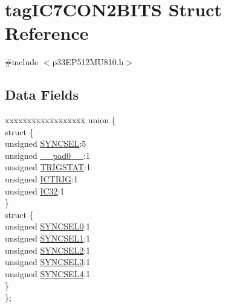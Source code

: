\hypertarget{structtag_i_c7_c_o_n2_b_i_t_s}{}\section{tag\+I\+C7\+C\+O\+N2\+B\+I\+TS Struct Reference}
\label{structtag_i_c7_c_o_n2_b_i_t_s}


{\ttfamily \#include $<$p33\+E\+P512\+M\+U810.\+h$>$}

\subsection*{Data Fields}
\begin{DoxyCompactItemize}
\item 
\begin{tabbing}
xx\=xx\=xx\=xx\=xx\=xx\=xx\=xx\=xx\=\kill
union \{\\
\>struct \{\\
\>\>unsigned \hyperlink{structtag_i_c7_c_o_n2_b_i_t_s_a35fbbe11485c2615ed27535b62c3fa35}{SYNCSEL}:5\\
\>\>unsigned \hyperlink{structtag_i_c7_c_o_n2_b_i_t_s_adf71f3d8410c1f1dbbc96680a92c49af}{\_\_pad0\_\_}:1\\
\>\>unsigned \hyperlink{structtag_i_c7_c_o_n2_b_i_t_s_ab379549de54ac93ad4aa73686c34cb7c}{TRIGSTAT}:1\\
\>\>unsigned \hyperlink{structtag_i_c7_c_o_n2_b_i_t_s_a79bd14cfd2e403f3a96ce0b3bb58097b}{ICTRIG}:1\\
\>\>unsigned \hyperlink{structtag_i_c7_c_o_n2_b_i_t_s_afc705120246cb4ca0c93c87817519b7f}{IC32}:1\\
\>\} \\
\>struct \{\\
\>\>unsigned \hyperlink{structtag_i_c7_c_o_n2_b_i_t_s_a3b5df3154fde5141e6ac0156425ff8b4}{SYNCSEL0}:1\\
\>\>unsigned \hyperlink{structtag_i_c7_c_o_n2_b_i_t_s_a50e73f95ab1c258ddc64f69c0991deaf}{SYNCSEL1}:1\\
\>\>unsigned \hyperlink{structtag_i_c7_c_o_n2_b_i_t_s_a304907a5d2c4cbf1114a54642a85951e}{SYNCSEL2}:1\\
\>\>unsigned \hyperlink{structtag_i_c7_c_o_n2_b_i_t_s_a6bbd1bd2ead6c9fa713969c6eb0f0c75}{SYNCSEL3}:1\\
\>\>unsigned \hyperlink{structtag_i_c7_c_o_n2_b_i_t_s_a0cd5bbe196c7974953909d27a6307bb7}{SYNCSEL4}:1\\
\>\} \\
\}; \\

\end{tabbing}\end{DoxyCompactItemize}


